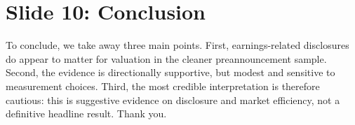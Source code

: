 \documentclass[11pt,a4paper]{article}
\begin{document}
\section*{Slide 10: Conclusion}
To conclude, we take away three main points. First, earnings-related disclosures do appear to matter for valuation in the cleaner preannouncement sample. Second, the evidence is directionally supportive, but modest and sensitive to measurement choices. Third, the most credible interpretation is therefore cautious: this is suggestive evidence on disclosure and market efficiency, not a definitive headline result. Thank you.
\end{document}
